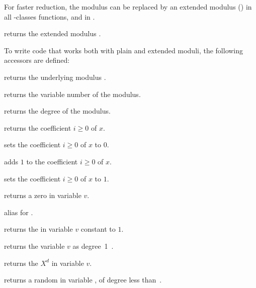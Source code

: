
For faster reduction, the modulus  can be replaced by an extended
modulus () in all -classes functions, and in
.

 returns the extended modulus .

To write code that works both with plain and extended moduli, the following
accessors are defined:

 returns the underlying modulus .

 returns the variable number of the modulus.

 returns the degree of the modulus.


 returns the coefficient $i\ge 0$ of $x$.

 sets the coefficient $i\ge 0$ of $x$ to
$0$.

 adds $1$ to the coefficient $i\ge 0$ of $x$.

 sets the coefficient $i\ge 0$ of $x$ to $1$.









 returns a zero  in variable $v$.

 alias for .

 returns the  in variable $v$ constant to
$1$.

 returns the variable $v$ as degree~1~.

 returns the 
$X^d$ in variable $v$.

 returns a random 
in variable , of degree less than~.


